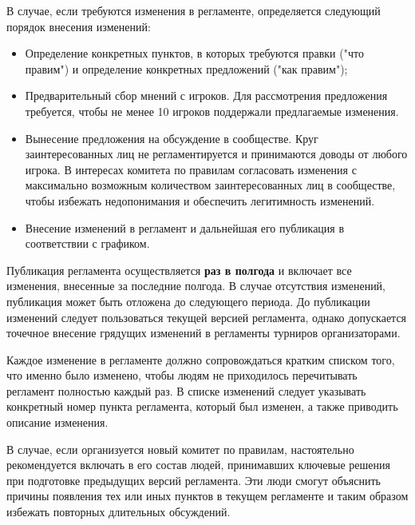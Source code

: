 В случае, если требуются изменения в регламенте, определяется следующий порядок внесения изменений:
\begin{itemize}
	\item Определение конкретных пунктов, в которых требуются правки ("что правим") и определение конкретных предложений ("как правим");
	\item Предварительный сбор мнений с игроков. Для рассмотрения предложения требуется, чтобы не менее 10 игроков поддержали предлагаемые изменения.
	\item Вынесение предложения на обсуждение в сообществе. Круг заинтересованных лиц не регламентируется и принимаются доводы от любого игрока. В интересах комитета по правилам согласовать изменения с максимально возможным количеством заинтересованных лиц в сообществе, чтобы избежать недопонимания и обеспечить легитимность изменений.
	\item Внесение изменений в регламент и дальнейшая его публикация в соответствии с графиком.
\end{itemize}

Публикация регламента осуществляется \textbf{раз в полгода} и включает все изменения, внесенные за последние полгода. В случае отсутствия изменений, публикация может быть отложена до следующего периода. До публикации изменений следует пользоваться текущей версией регламента, однако допускается точечное внесение грядущих изменений в регламенты турниров организаторами.

Каждое изменение в регламенте должно сопровождаться кратким списком того, что именно было изменено, чтобы людям не приходилось перечитывать регламент полностью каждый раз. В списке изменений следует указывать конкретный номер пункта регламента, который был изменен, а также приводить описание изменения.

В случае, если организуется новый комитет по правилам, настоятельно рекомендуется включать в его состав людей, принимавших ключевые решения при подготовке предыдущих версий регламента. Эти люди смогут объяснить причины появления тех или иных пунктов в текущем регламенте и таким образом избежать повторных длительных обсуждений.
